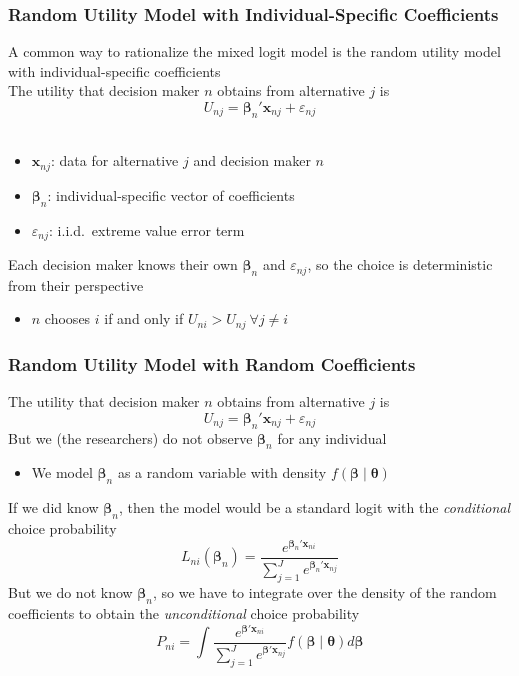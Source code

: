 \documentclass{beamer}\usepackage[]{graphicx}\usepackage[]{color}
\begin{document}
\begin{frame}\frametitle{Random Utility Model with Individual-Specific Coefficients}
	A common way to rationalize the mixed logit model is the random utility model with individual-specific coefficients \\
	\vspace{3ex}
    The utility that decision maker $n$ obtains from alternative $j$ is
    $$U_{nj} = \bm{\beta}_n' \bm{x}_{nj} + \varepsilon_{nj}$$ \\
    \begin{itemize}
        \item $\bm{x}_{nj}$: data for alternative $j$ and decision maker $n$
        \item $\bm{\beta}_n$: individual-specific vector of coefficients
        \item $\varepsilon_{nj}$: i.i.d.\ extreme value error term
    \end{itemize}
    \vspace{3ex}
    Each decision maker knows their own $\bm{\beta}_n$ and $\varepsilon_{nj}$, so the choice is deterministic from their perspective
    \begin{itemize}
        \item $n$ chooses $i$ if and only if $U_{ni} > U_{nj} ~\forall j \neq i$
    \end{itemize}
\end{frame}

\begin{frame}\frametitle{Random Utility Model with Random Coefficients}
	The utility that decision maker $n$ obtains from alternative $j$ is
    $$U_{nj} = \bm{\beta}_n' \bm{x}_{nj} + \varepsilon_{nj}$$
    But we (the researchers) do not observe $\bm{\beta}_n$ for any individual
    \begin{itemize}
    	\item We model $\bm{\beta}_n$ as a random variable with density $f(\bm{\beta} \mid \bm{\theta})$
    \end{itemize}
    \vspace{2ex}
    If we did know $\bm{\beta}_n$, then the model would be a standard logit with the \emph{conditional} choice probability
    $$L_{ni}(\bm{\beta}_n) = \frac{e^{\bm{\beta}_n' \bm{x}_{ni}}}{\sum_{j = 1}^J e^{\bm{\beta}_n' \bm{x}_{nj}}}$$
    But we do not know $\bm{\beta}_n$, so we have to integrate over the density of the random coefficients to obtain the \emph{unconditional} choice probability
    $$P_{ni} = \int \frac{e^{\bm{\beta}' \bm{x}_{ni}}}{\sum_{j = 1}^J e^{\bm{\beta}' \bm{x}_{nj}}} f(\bm{\beta} \mid \bm{\theta}) d \bm{\beta}$$
\end{frame}
\end{document}
